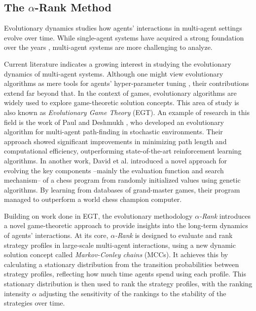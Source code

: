 \subsection{The \texorpdfstring{$\alpha$}{alpha}-Rank Method}

    Evolutionary dynamics studies how agents' interactions in multi-agent settings evolve over time. While single-agent systems have acquired a strong foundation over the years \cite{10.5555/2831071.2831085}, multi-agent systems are more challenging to analyze.\tinydouble

    \noindent
    Current literature indicates a growing interest in studying the evolutionary dynamics of multi-agent systems. Although one might view evolutionary algorithms as mere tools for agents' hyper-parameter tuning \cite{Sinha_2023}\cite{ganapathy2020studygeneticalgorithmshyperparameter}, their contributions extend far beyond that. In the context of games, evolutionary algorithms are widely used to explore game-theoretic solution concepts. This area of study is also known as \emph{Evolutionary Game Theory} (EGT). An example of research in this field is the work of Paul and Deshmukh \cite{paul2022multiagentpathfinding}, who developed an evolutionary algorithm for multi-agent path-finding in stochastic environments. Their approach showed significant improvements in minimizing path length and computational efficiency, outperforming state-of-the-art reinforcement learning algorithms. In another work, David et al. \cite{David_2014} introduced a novel approach for evolving the key components --mainly the evaluation function and search mechanism-- of a chess program from randomly initialized values using genetic algorithms. By learning from databases of grand-master games, their program managed to outperform a world chess champion computer.\tinydouble
    
    \noindent
    Building on work done in EGT, the evolutionary methodology \emph{$\alpha$-Rank} \cite{omidshafiei2019alpharank} introduces a novel game-theoretic approach to provide insights into the long-term dynamics of agents' interactions. At its core, \emph{$\alpha$-Rank} is designed to evaluate and rank strategy profiles in large-scale multi-agent interactions, using a new dynamic solution concept called \emph{Markov-Conley chains} (MCCs). It achieves this by calculating a stationary distribution from the transition probabilities between strategy profiles, reflecting how much time agents spend using each profile. This stationary distribution is then used to rank the strategy profiles, with the ranking intensity $\alpha$ adjusting the sensitivity of the rankings to the stability of the strategies over time.

